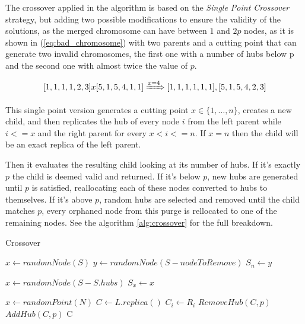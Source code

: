 \documentclass[onecolumn]{IEEEtran}
\begin{document}
The crossover applied in the algorithm is based on the \emph{Single Point Crossover} strategy, but adding
two possible modifications to ensure the validity of the solutions, as the merged chromosome can
have between $1$ and $2p$ nodes, as it is shown in (\ref{eq:bad_chromosome}) with two parents and a
cutting point that can generate two invalid chromosomes, the first one with a number of hubs below
p and the second one with almost twice the value of $p$.

\begin{equation}
  \label{eq:bad_chromosome}
  [1,1,1,1,2,3] x [5,1,5,4,1,1] \xRightarrow{x=4} [1,1,1,1,1,1], [5,1,5,4,2,3]
\end{equation}

This single point version generates a cutting point $x \in \{1,\dots,n\}$, creates a new child, and
then replicates the hub of every node $i$ from the left parent while $i<=x$ and the right
parent for every $x<i<=n$. If $x=n$ then the child will be an exact replica of the left parent.

Then it evaluates the resulting child looking at its number of hubs. If it's exactly $p$ the child
is deemed valid and returned. If it's below $p$, new hubs are generated until $p$ is satisfied, reallocating
each of these nodes converted to hubs to themselves. If it's above $p$, random hubs are selected and
removed until the child matches $p$, every orphaned node from this purge is rellocated to one of the
remaining nodes. See the algorithm \ref{alg:crossover} for the full breakdown.

\begin{algorithm}[H]
  \caption{Crossover}
  \label{alg:crossover}
  \begin{algorithmic}[1]
        \State $x \gets randomNode(S)$
        \State $y \gets randomNode(S - nodeToRemove)$
            \State $S_{n} \gets y$
          \EndIf
        \EndFor
      \EndWhile
    \EndFunction
    \item[]
        \State $x \gets randomNode(S - S.hubs)$
        \State $S_{x} \gets x$
      \EndWhile
    \EndFunction
  \item[]
  \State $x \gets randomPoint(N)$
  \State $C \gets L.replica()$
    \State $C_{i} \gets R_{i}$
  \EndFor
    $RemoveHub(C,p)$
    $AddHub(C,p)$
  \EndIf
  \State \Return C
  \end{algorithmic}
\end{algorithm}
\end{document}
